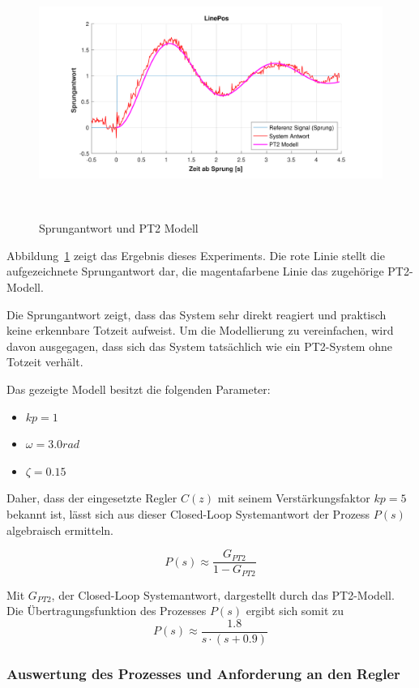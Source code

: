 \documentclass[main.tex]{subfiles} %
\begin{document}
\begin{figure}[H]
    \centering
    \includegraphics[width=1\linewidth]{fig_Parametrierung_Linienfolgeregler/Sprungantwort_System.pdf}
    \caption{Sprungantwort und PT2 Modell}~\label{fig:Sprungantwort}
\end{figure}

Abbildung~\ref{fig:Sprungantwort} zeigt das Ergebnis dieses Experiments. Die
rote Linie stellt die aufgezeichnete Sprungantwort dar, die magentafarbene
Linie das zugehörige PT2-Modell.

Die Sprungantwort zeigt, dass das System sehr direkt reagiert und praktisch
keine erkennbare Totzeit aufweist. Um die Modellierung zu vereinfachen, wird
davon ausgegagen, dass sich das System tatsächlich wie ein PT2-System ohne
Totzeit verhält.

Das gezeigte Modell besitzt die folgenden Parameter:

\begin{itemize}
    \item $kp = 1$
    \item $\omega = 3.0 rad$
    \item $\zeta = 0.15$
\end{itemize}

Daher, dass der eingesetzte Regler $C(z)$ mit seinem Verstärkungsfaktor $kp =
    5$ bekannt ist, lässt sich aus dieser Closed-Loop Systemantwort der Prozess
$P(s)$ algebraisch ermitteln.

\[
    P(s) \approx \frac{G_{PT2}}{1 - G_{PT2}}
\]

Mit $G_{PT2}$, der Closed-Loop Systemantwort, dargestellt durch das PT2-Modell.
Die Übertragungsfunktion des Prozesses $P(s)$ ergibt sich somit zu
\[
    P(s) \approx \frac{1.8}{s \cdot (s + 0.9)}
\]

\subsubsection*{Auswertung des Prozesses und Anforderung an den Regler}
\end{document}
